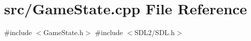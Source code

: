 \section{src/\+Game\+State.cpp File Reference}
\label{_game_state_8cpp}
{\ttfamily \#include $<$Game\+State.\+h$>$}\newline
{\ttfamily \#include $<$S\+D\+L2/\+S\+D\+L.\+h$>$}\newline
